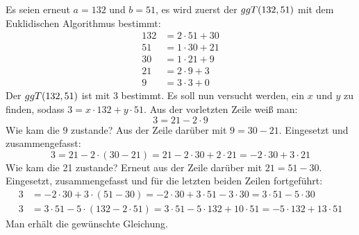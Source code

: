 \begin{example}
  Es seien erneut $a=132$ und $b=51$, es wird zuerst der $ggT(132,51)$ mit dem
  Euklidischen Algorithmus bestimmt:
  \begin{align*}
    132 & = 2 \cdot 51 + 30 \\
    51  & = 1 \cdot 30 + 21 \\
    30  & = 1 \cdot 21 + 9  \\
    21  & = 2 \cdot 9 + 3   \\
    9   & = 3 \cdot 3 + 0
  \end{align*}
  Der $ggT(132,51)$ ist mit 3 bestimmt. Es soll nun versucht werden, ein $x$ und $y$
  zu finden, sodass $3 = x \cdot 132 + y \cdot 51$. Aus der vorletzten Zeile weiß man:
  \begin{equation*}
    3 = 21 - 2 \cdot 9
  \end{equation*}
  Wie kam die 9 zustande? Aus der Zeile darüber mit $9 = 30 - 21$.
  Eingesetzt und zusammengefasst:
  \begin{equation*}
    3 = 21 - 2 \cdot (30 - 21) = 21 - 2 \cdot 30 + 2 \cdot 21 = -2 \cdot 30 + 3 \cdot 21
  \end{equation*}
  Wie kam die 21 zustande? Erneut aus der Zeile darüber mit $21 = 51 - 30$.
  Eingesetzt, zusammengefasst und für die letzten beiden Zeilen fortgeführt:
  \begin{align*}
    3 & = -2 \cdot 30 + 3 \cdot (51 - 30) =
    -2 \cdot 30 + 3 \cdot 51 - 3 \cdot 30 = 3 \cdot 51 - 5 \cdot 30                          \\
    3 & = 3 \cdot 51 - 5 \cdot (132 - 2 \cdot 51) = 3 \cdot 51 - 5 \cdot 132 + 10 \cdot 51 =
    -5 \cdot 132 + 13 \cdot 51
  \end{align*}
  Man erhält die gewünschte Gleichung.
\end{example}

